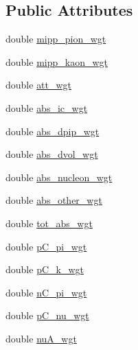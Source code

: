 \subsection*{Public Attributes}
\begin{DoxyCompactItemize}
\item 
double \hyperlink{class_neutrino_flux_reweight_1_1_reweight_driver_a8e9c45612df3e46980dd60e9247311c4}{mipp\-\_\-pion\-\_\-wgt}
\item 
double \hyperlink{class_neutrino_flux_reweight_1_1_reweight_driver_a908938bcd5304de35956da51a806ef62}{mipp\-\_\-kaon\-\_\-wgt}
\item 
double \hyperlink{class_neutrino_flux_reweight_1_1_reweight_driver_acf77f623752ed962a5fa5524f3c44653}{att\-\_\-wgt}
\item 
double \hyperlink{class_neutrino_flux_reweight_1_1_reweight_driver_a9c6a48cbe08d905d133d51822636ad16}{abs\-\_\-ic\-\_\-wgt}
\item 
double \hyperlink{class_neutrino_flux_reweight_1_1_reweight_driver_a39f06df253604d15c9c1a77dc77b7fad}{abs\-\_\-dpip\-\_\-wgt}
\item 
double \hyperlink{class_neutrino_flux_reweight_1_1_reweight_driver_aa30940f6b8614220a4b5a0402b6db2b2}{abs\-\_\-dvol\-\_\-wgt}
\item 
double \hyperlink{class_neutrino_flux_reweight_1_1_reweight_driver_ae110a4925afc9cbbcfa0734248d04747}{abs\-\_\-nucleon\-\_\-wgt}
\item 
double \hyperlink{class_neutrino_flux_reweight_1_1_reweight_driver_ace1bffcc969ab123df49094a8599cf34}{abs\-\_\-other\-\_\-wgt}
\item 
double \hyperlink{class_neutrino_flux_reweight_1_1_reweight_driver_a8793b0ebf9476d07d5fb68503060c0fb}{tot\-\_\-abs\-\_\-wgt}
\item 
double \hyperlink{class_neutrino_flux_reweight_1_1_reweight_driver_a488fa95dec3079d30e56973fd4de3783}{p\-C\-\_\-pi\-\_\-wgt}
\item 
double \hyperlink{class_neutrino_flux_reweight_1_1_reweight_driver_a082aaa736863e7bdfc8a057fcc78164c}{p\-C\-\_\-k\-\_\-wgt}
\item 
double \hyperlink{class_neutrino_flux_reweight_1_1_reweight_driver_aaf002e71ebfbd7651b0e2c6d2aa11f43}{n\-C\-\_\-pi\-\_\-wgt}
\item 
double \hyperlink{class_neutrino_flux_reweight_1_1_reweight_driver_a96bc68526c4939c0018aa41d94c3a106}{p\-C\-\_\-nu\-\_\-wgt}
\item 
double \hyperlink{class_neutrino_flux_reweight_1_1_reweight_driver_a1b735257c858f29876af497ea6be5f55}{nu\-A\-\_\-wgt}

\end{DoxyCompactItemize}
